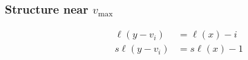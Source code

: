 \documentclass{amsart}[12pt]
\theoremstyle{definition}
\newcommand{\sk}{s\ell}
\begin{document}
  




\subsubsection{Structure near $v_{\max}$}
\begin{align*}
\ell(y-v_i) &= \ell(x)-i  \\
\sk(y-v_i) &= \sk(x)-1
\end{align*}





\end{document}
